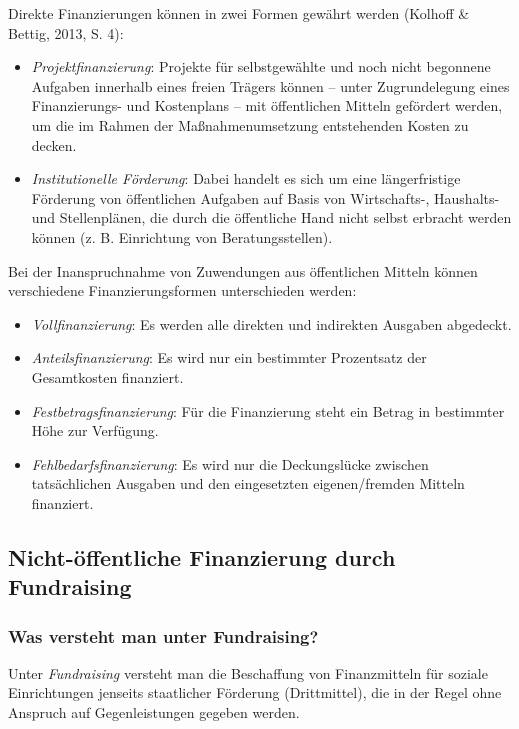 \documentclass[
  letterpaper,
]{book}
\begin{document}
Direkte Finanzierungen können in zwei Formen gewährt werden (Kolhoff \&
Bettig, 2013, S. 4):

\begin{itemize}
\item
  \emph{Projektfinanzierung}: Projekte für selbstgewählte und noch nicht
  begonnene Aufgaben innerhalb eines freien Trägers können -- unter
  Zugrundelegung eines Finanzierungs- und Kostenplans -- mit
  öffentlichen Mitteln gefördert werden, um die im Rahmen der
  Maßnahmenumsetzung entstehenden Kosten zu decken.
\item
  \emph{Institutionelle Förderung}: Dabei handelt es sich um eine
  längerfristige Förderung von öffentlichen Aufgaben auf Basis von
  Wirtschafts-, Haushalts- und Stellenplänen, die durch die öffentliche
  Hand nicht selbst erbracht werden können (z. B. Einrichtung von
  Beratungsstellen).
\end{itemize}

Bei der Inanspruchnahme von Zuwendungen aus öffentlichen Mitteln können
verschiedene Finanzierungsformen unterschieden werden:

\begin{itemize}
\item
  \emph{Vollfinanzierung}: Es werden alle direkten und indirekten
  Ausgaben abgedeckt.
\item
  \emph{Anteilsfinanzierung}: Es wird nur ein bestimmter Prozentsatz der
  Gesamtkosten finanziert.
\item
  \emph{Festbetragsfinanzierung}: Für die Finanzierung steht ein Betrag
  in bestimmter Höhe zur Verfügung.
\item
  \emph{Fehlbedarfsfinanzierung}: Es wird nur die Deckungslücke zwischen
  tatsächlichen Ausgaben und den eingesetzten eigenen/fremden Mitteln
  finanziert.
\end{itemize}

\subsection{Nicht-öffentliche Finanzierung durch
Fundraising}\label{nicht-ffentliche-finanzierung-durch-fundraising}

\subsubsection{Was versteht man unter Fundraising?}\label{fundraising}

Unter \emph{Fundraising} versteht man die Beschaffung von Finanzmitteln
für soziale Einrichtungen jenseits staatlicher Förderung (Drittmittel),
die in der Regel ohne Anspruch auf Gegenleistungen gegeben werden.
\end{document}
